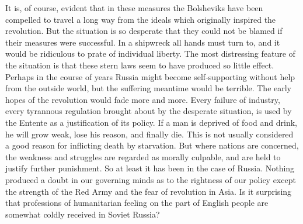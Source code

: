 It is, of course, evident that in these measures the Bolsheviks have been compelled to travel a long way from the ideals which originally inspired the revolution. But the situation is so desperate that they could not be blamed if their measures were successful. In a shipwreck all hands must turn to, and it would be ridiculous to prate of individual liberty. The most distressing feature of the situation is that these stern laws seem to have produced so little effect. Perhaps in the course of years Russia might become self-supporting without help from the outside world, but the suffering meantime would be terrible. The early hopes of the revolution would fade more and more. Every failure of industry, every tyrannous regulation brought about by the desperate situation, is used by the Entente as a justification of its policy. If a man is deprived of food and drink, he will grow weak, lose his reason, and finally die. This is not usually considered a good reason for inflicting death by starvation. But where nations are concerned, the weakness and struggles are regarded as morally culpable, and are held to justify further punishment. So at least it has been in the case of Russia. Nothing produced a doubt in our governing minds as to the rightness of our policy except the strength of the Red Army and the fear of revolution in Asia. Is it surprising that professions of humanitarian feeling on the part of English people are somewhat coldly received in Soviet Russia?